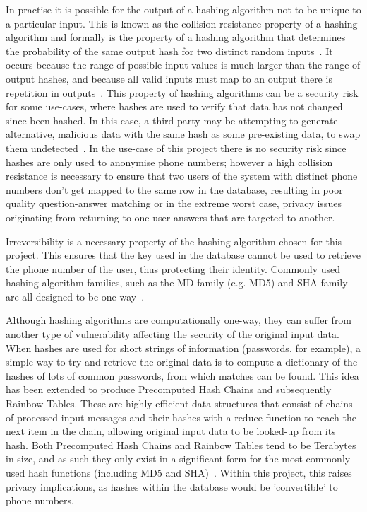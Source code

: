 \documentclass[authoryearcitations]{UoYCSproject}
\begin{document}
In practise it is possible for the output of a hashing algorithm not to be unique to a particular input.  This is known as the collision resistance property of a hashing algorithm and formally is the property of a hashing algorithm that determines the probability of the same output hash for two distinct random inputs~\cite{mitCryptographyMd5}.  It occurs because the range of possible input values is much larger than the range of output hashes, and because all valid inputs must map to an output there is repetition in outputs~\cite{mitCryptographyMd5}.  This property of hashing algorithms can be a security risk for some use-cases, where hashes are used to verify that data has not changed since been hashed.  In this case, a third-party may be attempting to generate alternative, malicious data with the same hash as some pre-existing data, to swap them undetected~\cite{securityEngineeringHashingAnderson}.  In the use-case of this project there is no security risk since hashes are only used to anonymise phone numbers; however a high collision resistance is necessary to ensure that two users of the system with distinct phone numbers don't get mapped to the same row in the database, resulting in poor quality question-answer matching or in the extreme worst case, privacy issues originating from returning to one user answers that are targeted to another.

Irreversibility is a necessary property of the hashing algorithm chosen for this project.  This ensures that the key used in the database cannot be used to retrieve the phone number of the user, thus protecting their identity.  Commonly used hashing algorithm families, such as the MD family (e.g. MD5) and SHA family are all designed to be one-way~\cite{schneierCryptanalysisMD5SHA}.

Although hashing algorithms are computationally one-way, they can suffer from another type of vulnerability affecting the security of the original input data.  When hashes are used for short strings of information (passwords, for example), a simple way to try and retrieve the original data is to compute a dictionary of the hashes of lots of common passwords, from which matches can be found.  This idea has been extended to produce Precomputed Hash Chains and subsequently Rainbow Tables.  These are highly efficient data structures that consist of chains of processed input messages and their hashes with a reduce function to reach the next item in the chain, allowing original input data to be looked-up from its hash.  Both Precomputed Hash Chains and Rainbow Tables tend to be Terabytes in size, and as such they only exist in a significant form for the most commonly used hash functions (including MD5 and SHA)~\cite{Teat:2011:SCH:2016039.2016072}.  Within this project, this raises privacy implications, as hashes within the database would be 'convertible' to phone numbers.
\end{document}
